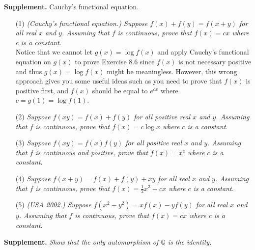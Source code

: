 \documentclass{article}
\begin{document}
\textbf{Supplement.} Cauchy's functional equation.
\begin{enumerate}
\item[(1)]
\emph{(Cauchy's functional equation.) Suppose $f(x) + f(y) = f(x + y)$ for all real $x$ and $y$.
Assuming that $f$ is continuous, prove that $f(x) = cx$ where $c$ is a constant}. \\

Notice that we cannot let $g(x) = \log f(x)$
and apply Cauchy's functional equation on $g(x)$
to prove Exercise 8.6 since $f(x)$ is not necessary positive and thus
$g(x) = \log f(x)$ might be meaningless.
However, this wrong approach gives you some useful ideas such as
you need to prove that $f(x)$ is positive first,
and $f(x)$ should be equal to $e^{cx}$ where $c = g(1) = \log f(1)$.

\item[(2)]
\emph{Suppose $f(xy) = f(x) + f(y)$ for all positive real $x$ and $y$.
Assuming that $f$ is continuous, prove that $f(x) = c \log x$ where $c$ is a constant}.

\item[(3)]
\emph{Suppose $f(xy) = f(x)f(y)$ for all positive real $x$ and $y$.
Assuming that $f$ is continuous and positive,
prove that $f(x) = x^c$ where $c$ is a constant}.

\item[(4)]
\emph{Suppose $f(x + y) = f(x) + f(y) + xy$ for all real $x$ and $y$.
Assuming that $f$ is continuous,
prove that $f(x) = \frac{1}{2}x^2 + cx$ where $c$ is a constant}.

\item[(5)]
\emph{(USA 2002.) Suppose $f(x^2 - y^2) = x f(x) - y f(y)$ for all real $x$ and $y$.
Assuming that $f$ is continuous,
prove that $f(x) = cx$ where $c$ is a constant}. \\
\end{enumerate}



\textbf{Supplement.}
\emph{Show that the only automorphism of $\mathbb{Q}$ is the identity.} \\
\end{document}
